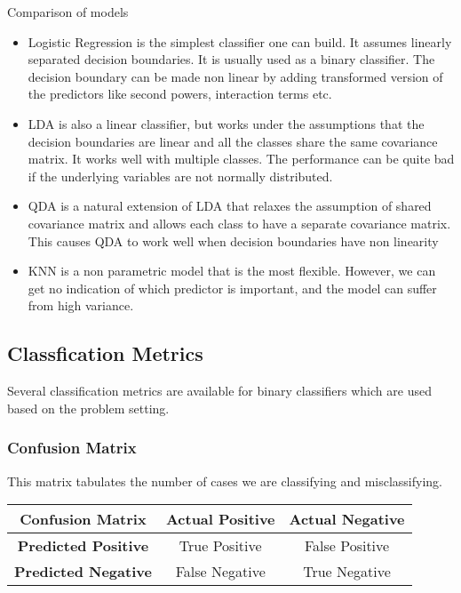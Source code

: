 \documentclass[11pt, a4paper]{article}
\begin{document}
    Comparison of models
    \begin{itemize}
        \item Logistic Regression is the simplest classifier one can build. It assumes linearly separated decision boundaries. It is usually used as a binary classifier. The decision boundary can be made non linear by adding transformed version of the predictors like second powers, interaction terms etc.
        \item LDA is also a linear classifier, but works under the assumptions that the decision boundaries are linear and all the classes share the same covariance matrix. It works well with multiple classes. The performance can be quite bad if the underlying variables are not normally distributed.
        \item QDA is a natural extension of LDA that relaxes the assumption of shared covariance matrix and allows each class to have a separate covariance matrix. This causes QDA to work well when decision boundaries have non linearity
        \item KNN is a non parametric model that is the most flexible. However, we can get no indication of which predictor is important, and the model can suffer from high variance.
    \end{itemize}


    \subsection{Classfication Metrics}
    Several classification metrics are available for binary classifiers which are used based on the problem setting.

    \subsubsection{Confusion Matrix}
    This matrix tabulates the number of cases we are classifying and misclassifying.
    \begin{table}[h]
    \centering
    \begin{tabular}{c|c|c}
        Confusion Matrix & \textbf{Actual Positive} & \textbf{Actual Negative}\\ \hline
        \textbf{Predicted Positive} & True Positive & False Positive\\ \hline
        \textbf{Predicted Negative} & False Negative & True Negative\\
    \end{tabular}
    \end{table}
\end{document}
